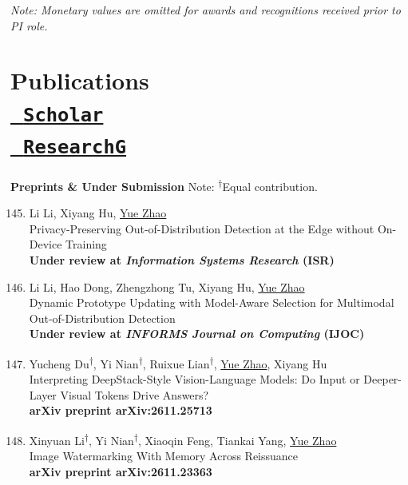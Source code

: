 \documentclass[margin,line,pifont,palatino,courier]{res}
\newcommand{\equalcontrib}{\textsuperscript{$\dagger$}}
\newenvironment{benumerate}[1]{
    \let\oldItem\item
    \def\item{\addtocounter{enumi}{-2}\oldItem}
    \begin{enumerate}[leftmargin=0.25in,label=\textcolor{uscred}{\arabic*.}]
    \setcounter{enumi}{#1}
    \addtocounter{enumi}{1}
}{
    \end{enumerate}
}
\begin{document}
\begin{resume}
\small\textit{Note: Monetary values are omitted for awards and recognitions received prior to PI role.}



\section{\sc Publications \\
{\href{https://scholar.google.com/citations?user=zoGDYsoAAAAJ}{\faGoogle~\texttt{Scholar}}\\
\href{https://www.researchgate.net/profile/Yue_Zhao191}{\faResearchgate~\texttt{ResearchG}}}}


\textbf{\color{uscred} Preprints \& Under Submission}
Note: \equalcontrib Equal contribution.

\begin{benumerate}{144}

    \item
    Li Li, Xiyang Hu, \underline{Yue Zhao}\\
    Privacy-Preserving Out-of-Distribution Detection at the Edge without On-Device Training\\
    \textbf{Under review at \textit{Information Systems Research} (ISR)}

    \item
    Li Li, Hao Dong, Zhengzhong Tu, Xiyang Hu, \underline{Yue Zhao}\\
    Dynamic Prototype Updating with Model-Aware Selection for Multimodal Out-of-Distribution Detection\\
    \textbf{Under review at \textit{INFORMS Journal on Computing} (IJOC)}

    \item
    Yucheng Du\equalcontrib, Yi Nian\equalcontrib, Ruixue Lian\equalcontrib, \underline{Yue Zhao}, Xiyang Hu\\
    Interpreting DeepStack-Style Vision-Language Models: Do Input or Deeper-Layer Visual Tokens Drive Answers?\\
    \textbf{arXiv preprint arXiv:2611.25713}

    \item
    Xinyuan Li\equalcontrib, Yi Nian\equalcontrib, Xiaoqin Feng, Tiankai Yang, \underline{Yue Zhao}\\
    Image Watermarking With Memory Across Reissuance\\
    \textbf{arXiv preprint arXiv:2611.23363}


\end{benumerate}
\end{resume}
\end{document}
